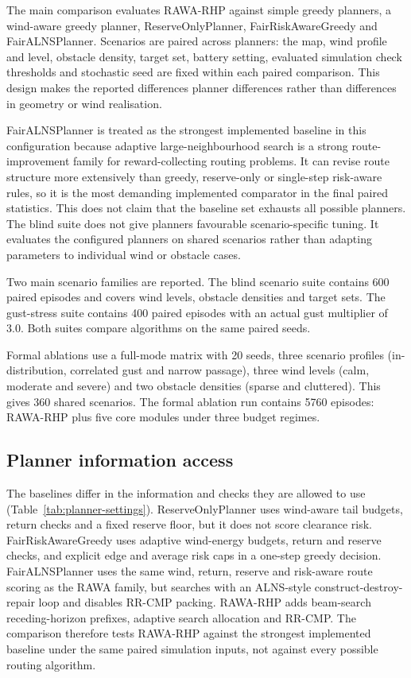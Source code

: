 \documentclass[preprint,12pt]{elsarticle}
\begin{document}
The main comparison evaluates RAWA-RHP against simple greedy planners, a wind-aware greedy planner, ReserveOnlyPlanner, FairRiskAwareGreedy and FairALNSPlanner. Scenarios are paired across planners: the map, wind profile and level, obstacle density, target set, battery setting, evaluated simulation check thresholds and stochastic seed are fixed within each paired comparison. This design makes the reported differences planner differences rather than differences in geometry or wind realisation.

FairALNSPlanner is treated as the strongest implemented baseline in this configuration because adaptive large-neighbourhood search is a strong route-improvement family for reward-collecting routing problems. It can revise route structure more extensively than greedy, reserve-only or single-step risk-aware rules, so it is the most demanding implemented comparator in the final paired statistics. This does not claim that the baseline set exhausts all possible planners. The blind suite does not give planners favourable scenario-specific tuning. It evaluates the configured planners on shared scenarios rather than adapting parameters to individual wind or obstacle cases.

Two main scenario families are reported. The blind scenario suite contains 600 paired episodes and covers wind levels, obstacle densities and target sets. The gust-stress suite contains 400 paired episodes with an actual gust multiplier of 3.0. Both suites compare algorithms on the same paired seeds.

Formal ablations use a full-mode matrix with 20 seeds, three scenario profiles (in-distribution, correlated gust and narrow passage), three wind levels (calm, moderate and severe) and two obstacle densities (sparse and cluttered). This gives 360 shared scenarios. The formal ablation run contains 5760 episodes: RAWA-RHP plus five core modules under three budget regimes.



\FloatBarrier

\subsection{Planner information access}

The baselines differ in the information and checks they are allowed to use (Table~\ref{tab:planner-settings}). ReserveOnlyPlanner uses wind-aware tail budgets, return checks and a fixed reserve floor, but it does not score clearance risk. FairRiskAwareGreedy uses adaptive wind-energy budgets, return and reserve checks, and explicit edge and average risk caps in a one-step greedy decision. FairALNSPlanner uses the same wind, return, reserve and risk-aware route scoring as the RAWA family, but searches with an ALNS-style construct-destroy-repair loop and disables RR-CMP packing. RAWA-RHP adds beam-search receding-horizon prefixes, adaptive search allocation and RR-CMP. The comparison therefore tests RAWA-RHP against the strongest implemented baseline under the same paired simulation inputs, not against every possible routing algorithm.
\end{document}
